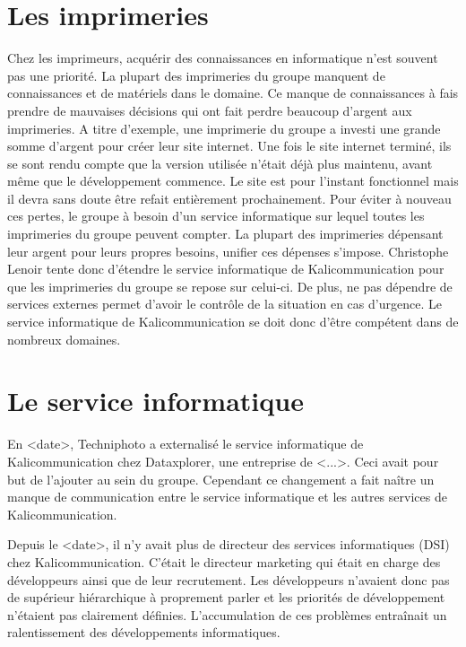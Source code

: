 
\section{Les imprimeries}
Chez les imprimeurs, acquérir des connaissances en informatique n'est souvent pas une priorité. La plupart des imprimeries du groupe manquent de connaissances et de matériels dans le domaine. Ce manque de connaissances à fais prendre de mauvaises décisions qui ont fait perdre beaucoup d'argent aux imprimeries.\newline
A titre d'exemple, une imprimerie du groupe a investi une grande somme d'argent pour créer leur site internet. Une fois le site internet terminé, ils se sont rendu compte que la version utilisée n'était déjà plus maintenu, avant même que le développement commence. Le site est pour l'instant fonctionnel mais il devra sans doute être refait entièrement prochainement.\newline
Pour éviter à nouveau ces pertes, le groupe à besoin d'un service informatique sur lequel toutes les imprimeries du groupe peuvent compter. La plupart des imprimeries dépensant leur argent pour leurs propres besoins, unifier ces dépenses s'impose. Christophe Lenoir tente donc d'étendre le service informatique de Kalicommunication pour que les imprimeries du groupe se repose sur celui-ci. De plus, ne pas dépendre de services externes permet d'avoir le contrôle de la situation en cas d'urgence. Le service informatique de Kalicommunication se doit donc d'être compétent dans de nombreux domaines.

\section{Le service informatique}
En <date>, Techniphoto a externalisé le service informatique de Kalicommunication chez Dataxplorer, une entreprise de <...>. Ceci avait pour but de l'ajouter au sein du groupe. Cependant ce changement a fait naître un manque de communication entre le service informatique et les autres services de Kalicommunication.

Depuis le <date>, il n'y avait plus de directeur des services informatiques (DSI) chez Kalicommunication. C'était le directeur marketing qui était en charge des développeurs ainsi que de leur recrutement. Les développeurs n'avaient donc pas de supérieur hiérarchique à proprement parler et les priorités de développement n'étaient pas clairement définies. L'accumulation de ces problèmes entraînait un ralentissement des développements informatiques.


